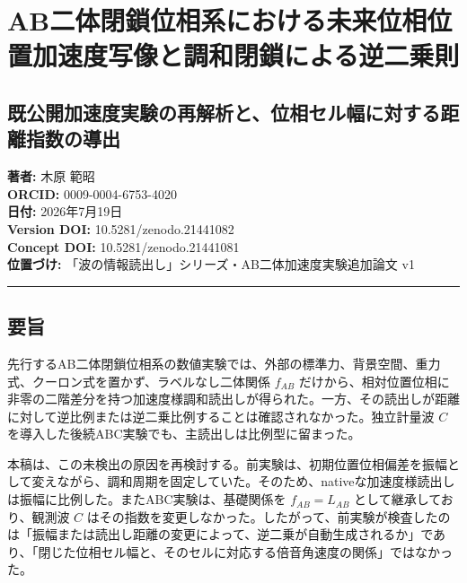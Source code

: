 \documentclass[
  10pt,
  a4paper,
]{ltjsarticle}
\author{}
\date{}
\begin{document}
\section{AB二体閉鎖位相系における未来位相位置加速度写像と調和閉鎖による逆二乗則}\label{abux4e8cux4f53ux9589ux9396ux4f4dux76f8ux7cfbux306bux304aux3051ux308bux672aux6765ux4f4dux76f8ux4f4dux7f6eux52a0ux901fux5ea6ux5199ux50cfux3068ux8abfux548cux9589ux9396ux306bux3088ux308bux9006ux4e8cux4e57ux5247}

\subsection{既公開加速度実験の再解析と、位相セル幅に対する距離指数の導出}\label{ux65e2ux516cux958bux52a0ux901fux5ea6ux5b9fux9a13ux306eux518dux89e3ux6790ux3068ux4f4dux76f8ux30bbux30ebux5e45ux306bux5bfeux3059ux308bux8dddux96e2ux6307ux6570ux306eux5c0eux51fa}

\textbf{著者:} 木原 範昭\\
\textbf{ORCID:} 0009-0004-6753-4020\\
\textbf{日付:} 2026年7月19日\\
\textbf{Version DOI:} 10.5281/zenodo.21441082\\
\textbf{Concept DOI:} 10.5281/zenodo.21441081\\
\textbf{位置づけ:} 「波の情報読出し」シリーズ・AB二体加速度実験追加論文
v1

\begin{center}\rule{0.5\linewidth}{0.5pt}\end{center}

\subsection{要旨}\label{ux8981ux65e8}

先行するAB二体閉鎖位相系の数値実験では、外部の標準力、背景空間、重力式、クーロン式を置かず、ラベルなし二体関係
\(f_{AB}\)
だけから、相対位置位相に非零の二階差分を持つ加速度様調和読出しが得られた。一方、その読出しが距離に対して逆比例または逆二乗比例することは確認されなかった。独立計量波
\(C\) を導入した後続ABC実験でも、主読出しは比例型に留まった。

本稿は、この未検出の原因を再検討する。前実験は、初期位置位相偏差を振幅として変えながら、調和周期を固定していた。そのため、nativeな加速度様読出しは振幅に比例した。またABC実験は、基礎関係を
\(f_{AB}=L_{AB}\) として継承しており、観測波 \(C\)
はその指数を変更しなかった。したがって、前実験が検査したのは「振幅または読出し距離の変更によって、逆二乗が自動生成されるか」であり、「閉じた位相セル幅と、そのセルに対応する倍音角速度の関係」ではなかった。
\end{document}
